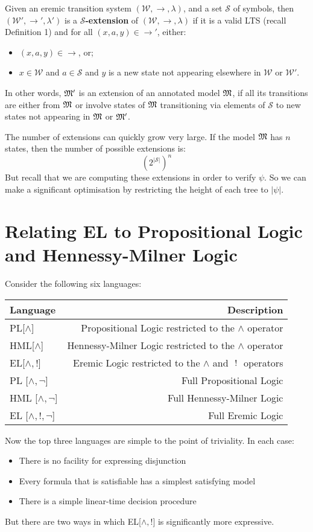 \begin{definition}
Given an eremic transition system $(\mathcal{W},\rightarrow,\lambda)$,  and a set $\mathcal{S}$ of symbols, then $(\mathcal{W'},\rightarrow',\lambda')$ is a {\bf $\mathcal{S}$-extension} of $(\mathcal{W},\rightarrow,\lambda)$ if it is a valid LTS (recall Definition 1) and for all $(x,a,y) \in \rightarrow'$, either:
\begin{itemize} 
\item
$(x, a, y) \in \rightarrow$,  or;
\item
 $x \in \mathcal{W}$ and $a \in \mathcal{S}$ and $y$ is a new state not appearing elsewhere in $\mathcal{W}$ or $\mathcal{W'}$.
\end{itemize}
\end{definition}
In other words, $\frak{M}'$ is an extension of an annotated model $\frak{M}$, if all its transitions are either from $\frak{M}$ or involve states of $\frak{M}$ transitioning via elements of $\mathcal{S}$ to new states not appearing in $\frak{M}$ or $\frak{M}'$.

The number of extensions can quickly grow very large.
If the model $\frak{M}$ has $n$ states, then the number of possible extensions is:
\[
({2^{|\mathcal{S}|}})^n
\] 
But recall that we are computing these extensions in order to verify $\psi$. So we can make a significant optimisation by restricting the height of each tree to $|\psi|$.

\section{Relating EL to Propositional Logic and Hennessy-Milner Logic}
Consider the following six languages:
\begin{center}
\begin{tabular}{ l | r }
Language & Description \\
\hline
PL[$\land$] & Propositional Logic restricted to the $\land$ operator \\
HML[$\land$] & Hennessy-Milner Logic restricted to the $\land$ operator \\
EL[$\land, !$] & Eremic Logic restricted to the $\land$ and $\ ! \ $ operators \\
PL [$\land, \neg$] & Full Propositional Logic \\
HML [$\land, \neg$] & Full Hennessy-Milner Logic \\
EL [$\land, !, \neg$] & Full Eremic Logic \\
\end{tabular}
\end{center}
Now the top three languages are simple to the point of triviality. In each case:
\begin{itemize}
\item
There is no facility for expressing disjunction
\item
Every formula that is satisfiable has a simplest satisfying model
\item
There is a simple linear-time decision procedure
\end{itemize}
But there are two ways in which EL[$\land, !$]  is significantly more expressive.


